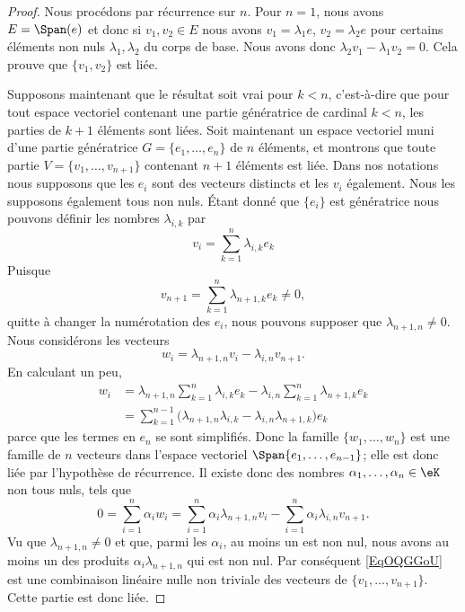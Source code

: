 \begin{proof}
	Nous procédons par récurrence sur \( n\). Pour \( n=1\), nous avons \( E=\Span(e)\) et donc si \( v_1,v_2\in E\) nous avons \( v_1=\lambda_1 e\), \( v_2=\lambda_2e\) pour certains éléments non nuls \( \lambda_1,\lambda_2\) du corps de base. Nous avons donc \( \lambda_2v_1-\lambda_1v_2=0\). Cela prouve que \( \{ v_1,v_2 \}\) est liée.

	Supposons maintenant que le résultat soit vrai pour \( k<n\), c'est-à-dire que pour tout espace vectoriel contenant une partie génératrice de cardinal \( k<n\), les parties de \( k+1\) éléments sont liées. Soit maintenant un espace vectoriel muni d'une partie génératrice \( G=\{ e_1,\ldots, e_n \}\) de \( n\) éléments, et montrons que toute partie \( V=\{ v_1,\ldots, v_{n+1} \}\) contenant \( n+1\) éléments est liée. Dans nos notations nous supposons que les \( e_i\) sont des vecteurs distincts et les \( v_i\) également. Nous les supposons également tous non nuls. Étant donné que \( \{ e_i \}\) est génératrice nous pouvons définir les nombres \( \lambda_{i,k}\) par
	\begin{equation}
		v_i=\sum_{k=1}^n\lambda_{i,k}e_k
	\end{equation}
	Puisque
	\begin{equation}
		v_{n+1}=\sum_{k=1}^n\lambda_{n+1,k}e_k\neq 0,
	\end{equation}
	quitte à changer la numérotation des \( e_i\), nous pouvons supposer que \( \lambda_{n+1,n}\neq 0\). Nous considérons les vecteurs
	\begin{equation}
		w_i=\lambda_{n+1,n}v_i-\lambda_{i,n}v_{n+1}.
	\end{equation}
	En calculant un peu,
	\begin{subequations}
		\begin{align}
			w_i & =\lambda_{n+1,n}\sum_{k=1}^n\lambda_{i,k}e_k-\lambda_{i,n}\sum_{k=1}^n\lambda_{n+1,k}e_k              \\
			    & =\sum_{k=1}^{n-1}\big( \lambda_{n+1,n}\lambda_{i,k}-\lambda_{i,n}\lambda_{n+1,k} \big)e_k
		\end{align}
	\end{subequations}
	parce que les termes en \( e_n\) se sont simplifiés. Donc la famille \( \{ w_1,\ldots, w_n \}\) est une famille de \( n\) vecteurs dans l'espace vectoriel \( \Span\{ e_1,\ldots, e_{n-1} \}\); elle est donc liée par l'hypothèse de récurrence. Il existe donc des nombres \( \alpha_1,\ldots, \alpha_n\in \eK\) non tous nuls, tels que
	\begin{equation}        \label{EqOQGGoU}
		0=\sum_{i=1}^n\alpha_iw_i=\sum_{i=1}^n\alpha_i\lambda_{n+1,n}v_i - \sum_{i=1}^n\alpha_i\lambda_{i,n} v_{n+1}.
	\end{equation}
	Vu que \( \lambda_{n+1,n}\neq 0\) et que, parmi les \( \alpha_i\), au moins un est non nul, nous avons au moins un des produits \( \alpha_i\lambda_{n+1,n}\) qui est non nul. Par conséquent \eqref{EqOQGGoU} est une combinaison linéaire nulle non triviale des vecteurs de \( \{ v_1,\ldots, v_{n+1} \}\). Cette partie est donc liée.
\end{proof}

